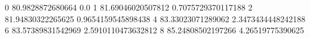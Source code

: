 0 80.9828872680664 0.0
1 81.69046020507812 0.7075729370117188
2 81.94830322265625 0.9654159545898438
4 83.33023071289062 2.3473434448242188
6 83.57389831542969 2.5910110473632812
8 85.24808502197266 4.26519775390625
